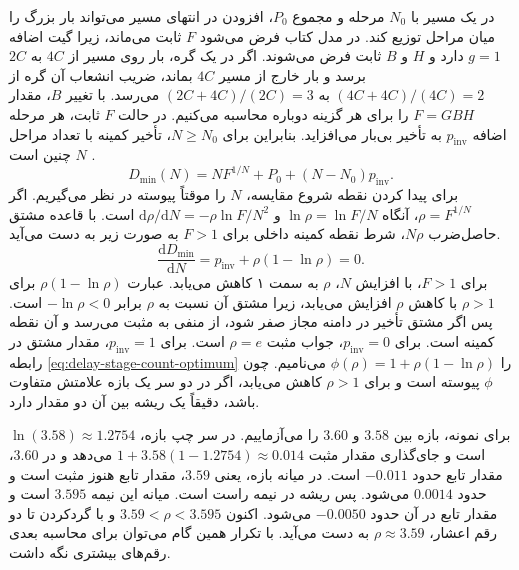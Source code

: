در یک مسیر با \(N_0\) مرحله و مجموع \(P_0\)، افزودن
 در انتهای مسیر می‌تواند بار بزرگ را میان مراحل
توزیع کند. در مدل کتاب فرض می‌شود \(F\) ثابت می‌ماند، زیرا
گیت اضافه \(g=1\) دارد و \(H\) و \(B\) ثابت فرض می‌شوند.
اگر در یک گره، بار روی مسیر از \(4C\) به \(2C\) برسد و
بار خارج از مسیر \(4C\) بماند، ضریب انشعاب آن گره از
\((4C+4C)/(4C)=2\) به \((2C+4C)/(2C)=3\) می‌رسد.
با تغییر \(B\)، مقدار \(F=GBH\) را برای هر گزینه دوباره
محاسبه می‌کنیم. در حالت \(F\) ثابت، هر مرحله اضافه \(p_{\mathrm{inv}}\)
به تأخیر بی‌بار می‌افزاید. بنابراین برای \(N\ge N_0\)، تأخیر
کمینه با تعداد مراحل \(N\) چنین است
\cite[روابط  و ، صفحات ۱۶۶ و ۱۶۷]{weste}
\cite[اسلایدهای ۱۹ و ۲۴ تا ۲۶]{logicaleffortslides}.
\begin{equation}
  D_{\min}(N)=NF^{1/N}+P_0+(N-N_0)p_{\mathrm{inv}}.
  \label{eq:delay-stage-count}
\end{equation}
برای پیدا کردن نقطه شروع مقایسه، \(N\) را موقتاً پیوسته در نظر
می‌گیریم. اگر \(\rho=F^{1/N}\)، آنگاه \(\ln\rho=\ln F/N\)
و \(\mathrm{d}\rho/\mathrm{d}N=-\rho\ln F/N^2\) است.
با قاعده مشتق حاصل‌ضرب \(N\rho\)، شرط نقطه کمینه داخلی
برای \(F>1\) به صورت زیر به دست می‌آید.
\begin{equation}
  \frac{\mathrm{d}D_{\min}}{\mathrm{d}N}
  =p_{\mathrm{inv}}+\rho(1-\ln\rho)=0.
  \label{eq:delay-stage-count-optimum}
\end{equation}
برای \(F>1\)، با افزایش \(N\)، \(\rho\) به سمت ۱ کاهش
می‌یابد. عبارت \(\rho(1-\ln\rho)\) برای \(\rho>1\)
با کاهش \(\rho\) افزایش می‌یابد، زیرا مشتق آن نسبت به
\(\rho\) برابر \(-\ln\rho<0\) است. پس اگر مشتق تأخیر
در دامنه مجاز صفر شود، از منفی به مثبت می‌رسد و آن نقطه
کمینه است. برای \(p_{\mathrm{inv}}=0\)، جواب مثبت \(\rho=e\) است.
برای \(p_{\mathrm{inv}}=1\)، مقدار مشتق در رابطه
\eqref{eq:delay-stage-count-optimum} را
\(\phi(\rho)=1+\rho(1-\ln\rho)\) می‌نامیم. چون
\(\phi\) پیوسته است و برای \(\rho>1\) کاهش می‌یابد، اگر
در دو سر یک بازه علامتش متفاوت باشد، دقیقاً یک ریشه بین
آن دو مقدار دارد.

برای نمونه، بازه بین \(3.58\) و \(3.60\) را می‌آزماییم.
در سر چپ بازه، \(\ln(3.58)\approx1.2754\) است و جای‌گذاری
مقدار مثبت \(1+3.58(1-1.2754)\approx0.014\) می‌دهد و
در \(3.60\)، مقدار تابع حدود \(-0.011\) است.
در میانه بازه، یعنی \(3.59\)، مقدار تابع هنوز مثبت است
و حدود \(0.0014\) می‌شود. پس ریشه در نیمه راست است.
میانه این نیمه \(3.595\) است و مقدار تابع در آن حدود
\(-0.0050\) می‌شود. اکنون \(3.59<\rho<3.595\) و با
گردکردن تا دو رقم اعشار، \(\rho\approx3.59\) به دست می‌آید.
با تکرار همین گام می‌توان برای محاسبه بعدی رقم‌های بیشتری نگه داشت.

